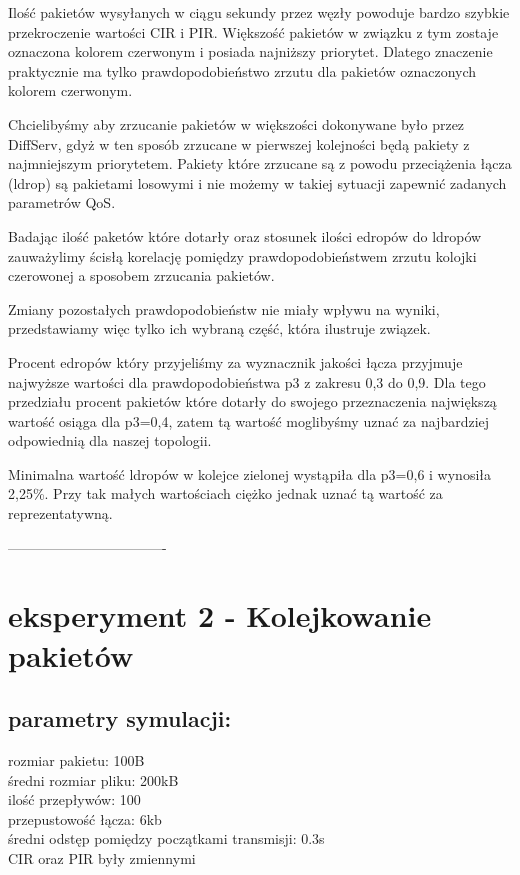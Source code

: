 \documentclass[a4paper]{article}
\begin{document}
Ilość pakietów wysyłanych w ciągu sekundy przez węzły powoduje bardzo szybkie przekroczenie wartości CIR i PIR. Większość pakietów w związku z tym zostaje oznaczona kolorem czerwonym i posiada najniższy priorytet. Dlatego znaczenie praktycznie ma tylko prawdopodobieństwo zrzutu dla pakietów oznaczonych kolorem czerwonym. 

Chcielibyśmy aby zrzucanie pakietów w większości dokonywane było przez DiffServ, gdyż w ten sposób zrzucane w pierwszej kolejności będą pakiety z najmniejszym priorytetem. Pakiety które zrzucane są z powodu przeciążenia łącza (ldrop) są pakietami losowymi i nie możemy w takiej sytuacji zapewnić zadanych parametrów QoS.

Badając ilość paketów które dotarły oraz stosunek ilości edropów do ldropów zauważylimy ścisłą korelację pomiędzy prawdopodobieństwem zrzutu kolojki czerowonej a sposobem zrzucania pakietów.

Zmiany pozostałych prawdopodobieństw nie miały wpływu na wyniki, przedstawiamy więc tylko ich wybraną część, która ilustruje związek.





Procent edropów który przyjeliśmy za wyznacznik jakości łącza przyjmuje najwyższe wartości dla prawdopodobieństwa p3 z zakresu 0,3 do 0,9. Dla tego przedziału procent pakietów które dotarły do swojego przeznaczenia największą wartość osiąga dla p3=0,4, zatem tą wartość moglibyśmy uznać za najbardziej odpowiednią dla naszej topologii. 

Minimalna wartość ldropów w kolejce zielonej wystąpiła dla p3=0,6 i wynosiła 2,25\%. Przy tak małych wartościach ciężko jednak uznać tą wartość za reprezentatywną.



----------------------------------



\section{eksperyment 2 - Kolejkowanie pakietów}

\subsection{parametry symulacji:}
rozmiar pakietu: 100B\\
średni rozmiar pliku: 200kB\\
ilość przepływów: 100\\
przepustowość łącza: 6kb\\
średni odstęp pomiędzy początkami transmisji: 0.3s\\
CIR oraz PIR były zmiennymi\\
\end{document}
